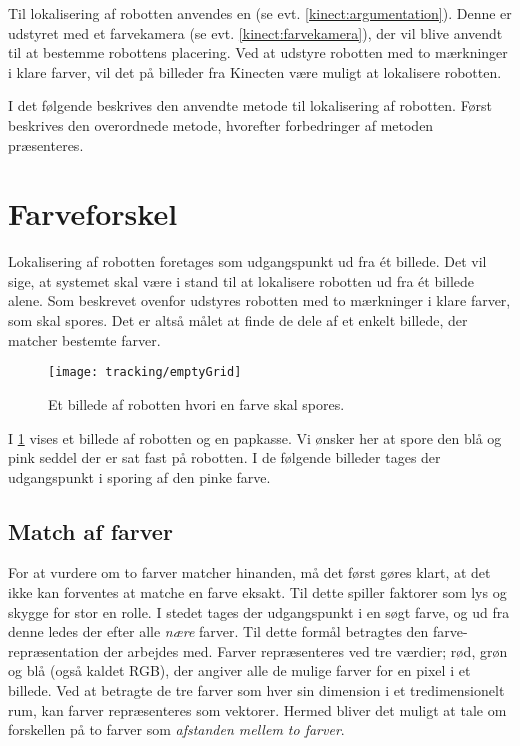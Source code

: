 Til lokalisering af robotten anvendes en \kinect (se evt. \cref{kinect:argumentation}).
Denne er udstyret med et farvekamera (se evt. \cref{kinect:farvekamera}), der vil blive anvendt til at bestemme robottens placering.
Ved at udstyre robotten med to mærkninger i klare farver, vil det på billeder fra Kinecten være muligt at lokalisere robotten.

I det følgende beskrives den anvendte metode til lokalisering af robotten.
Først beskrives den overordnede metode, hvorefter forbedringer af metoden præsenteres.

\section{Farveforskel}\label{tracking:colordiff}
Lokalisering af robotten foretages som udgangspunkt ud fra \'et billede.
Det vil sige, at systemet skal være i stand til at lokalisere robotten ud fra \'et billede alene.
Som beskrevet ovenfor udstyres robotten med to mærkninger i klare farver, som skal spores.
Det er altså målet at finde de dele af et enkelt billede, der matcher bestemte farver.

\begin{figure}[h]
\centering
\texttt{[image: tracking/emptyGrid]}
\caption{Et billede af robotten hvori en farve skal spores.}
\label{tracking:img:initial}
\end{figure}

I \cref{tracking:img:initial} vises et billede af robotten og en papkasse.
Vi ønsker her at spore den blå og pink seddel der er sat fast på robotten.
I de følgende billeder tages der udgangspunkt i sporing af den pinke farve.

\subsection{Match af farver}
For at vurdere om to farver matcher hinanden, må det først gøres klart, at det ikke kan forventes at matche en farve eksakt.
Til dette spiller faktorer som lys og skygge for stor en rolle.
I stedet tages der udgangspunkt i en søgt farve, og ud fra denne ledes der efter alle \textit{nære} farver.
Til dette formål betragtes den farve-repræsentation der arbejdes med.
Farver repræsenteres ved tre værdier; rød, grøn og blå (også kaldet RGB), der angiver alle de mulige farver for en pixel i et billede.
Ved at betragte de tre farver som hver sin dimension i et tredimensionelt rum, kan farver repræsenteres som vektorer.
Hermed bliver det muligt at tale om forskellen på to farver som \textit{afstanden mellem to farver}.


